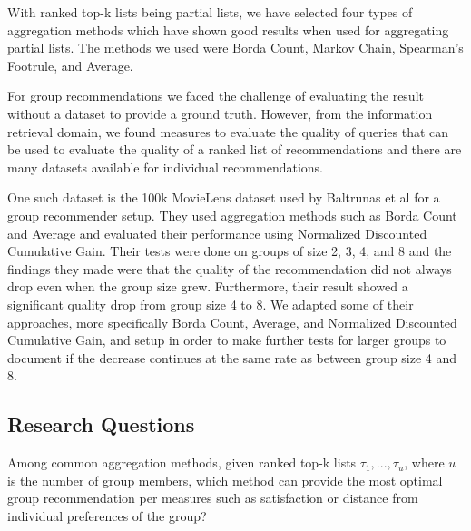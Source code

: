 With ranked top-k lists being partial lists, we have selected four types of aggregation methods which have shown good results when used for aggregating partial lists. The methods we used were Borda Count, Markov Chain, Spearman's Footrule, and Average\cite{Masthoff2004, rank:aggregation}.

For group recommendations we faced the challenge of evaluating the result without a dataset to provide a ground truth. However, from the information retrieval domain, we found measures to evaluate the quality of queries that can be used to evaluate the quality of a ranked list of recommendations and there are many datasets available for individual recommendations.

One such dataset is the 100k MovieLens dataset used by Baltrunas et al for a group recommender setup\cite{movielens100k, Baltrunas:2010:GRR:1864708.1864733}. 
They used aggregation methods such as Borda Count and Average and evaluated their performance using Normalized Discounted Cumulative Gain. Their tests were done on groups of size 2, 3, 4, and 8 and the findings they made were that the quality of the recommendation did not always drop even when the group size grew. Furthermore, their result showed a significant quality drop from group size 4 to 8. We adapted some of their approaches, more specifically Borda Count, Average, and Normalized Discounted Cumulative Gain, and setup in order to make further tests for larger groups to document if the decrease continues at the same rate as between group size 4 and 8.




\subsection{Research Questions}
Among common aggregation methods, given ranked top-k lists $\tau_1, ... , \tau_u$, where $u$ is the number of group members, which method can provide the most optimal group recommendation per measures such as satisfaction or distance from individual preferences of the group?

